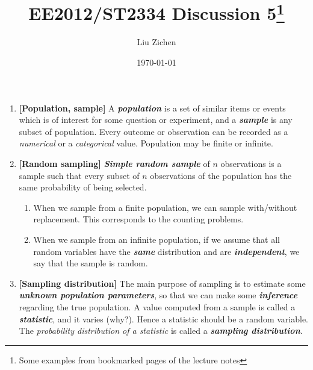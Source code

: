 \documentclass[a4paper]{article}
\title{EE2012/ST2334 Discussion 5\footnote{Some examples from bookmarked pages of the lecture notes}}
\author{Liu Zichen}
\date{\today}
\begin{document}
\maketitle

\begin{enumerate}

\item
\textbf{[Population, sample]}
A \textbf{\textit{population}} is a set of similar items or events which is of interest for some question or experiment, and a \textbf{\textit{sample}} is any subset of population. Every outcome or observation can be recorded as a \textit{numerical} or a \textit{categorical} value. Population may be finite or infinite.

\item
\textbf{[Random sampling]}
\textbf{\textit{Simple random sample}} of $n$ observations is a sample such that every subset of $n$ observations of the population has the same probability of being selected.
\begin{enumerate}
    \item When we sample from a finite population, we can sample with/without replacement. This corresponds to the counting problems.
    
    \item When we sample from an infinite population, if we assume that all random variables have the \textbf{\textit{same}} distribution and are \textbf{\textit{independent}}, we say that the sample is random.
\end{enumerate}
    
\item
\textbf{[Sampling distribution]}
The main purpose of sampling is to estimate some \textbf{\textit{unknown population parameters}}, so that we can make some \textit{\textbf{inference}} regarding the true population. A value computed from a sample is called a \textit{\textbf{statistic}}, and it varies (why?). Hence a statistic should be a random variable. The \textit{probability distribution of a statistic} is called a \textit{\textbf{sampling distribution}}.


\end{enumerate}
\end{document}
